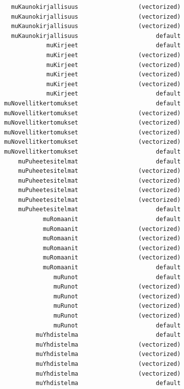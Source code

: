 \documentclass[
  letterpaper,
  DIV=11,
  numbers=noendperiod]{scrartcl}
\begin{document}
\begin{verbatim}
   muKaunokirjallisuus                 (vectorized)
   muKaunokirjallisuus                 (vectorized)
   muKaunokirjallisuus                 (vectorized)
   muKaunokirjallisuus                      default
             muKirjeet                      default
             muKirjeet                 (vectorized)
             muKirjeet                 (vectorized)
             muKirjeet                 (vectorized)
             muKirjeet                 (vectorized)
             muKirjeet                      default
 muNovellitkertomukset                      default
 muNovellitkertomukset                 (vectorized)
 muNovellitkertomukset                 (vectorized)
 muNovellitkertomukset                 (vectorized)
 muNovellitkertomukset                 (vectorized)
 muNovellitkertomukset                      default
     muPuheetesitelmat                      default
     muPuheetesitelmat                 (vectorized)
     muPuheetesitelmat                 (vectorized)
     muPuheetesitelmat                 (vectorized)
     muPuheetesitelmat                 (vectorized)
     muPuheetesitelmat                      default
            muRomaanit                      default
            muRomaanit                 (vectorized)
            muRomaanit                 (vectorized)
            muRomaanit                 (vectorized)
            muRomaanit                 (vectorized)
            muRomaanit                      default
               muRunot                      default
               muRunot                 (vectorized)
               muRunot                 (vectorized)
               muRunot                 (vectorized)
               muRunot                 (vectorized)
               muRunot                      default
          muYhdistelma                      default
          muYhdistelma                 (vectorized)
          muYhdistelma                 (vectorized)
          muYhdistelma                 (vectorized)
          muYhdistelma                 (vectorized)
          muYhdistelma                      default
\end{verbatim}
\end{document}
